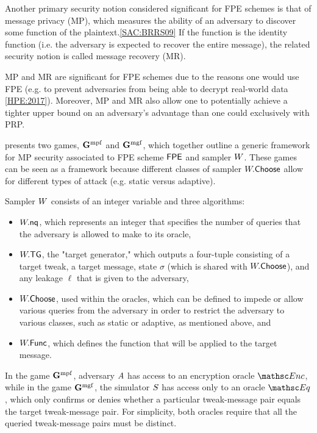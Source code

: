 
Another primary security notion considered significant for FPE schemes is that of message privacy (MP), which measures the ability of an adversary to discover some function of the plaintext.\ref{SAC:BRRS09} If the function is the identity function (i.e. the adversary is expected to recover the entire message), the related security notion is called message recovery (MR).

MP and MR are significant for FPE schemes due to the reasons one would use FPE (e.g. to prevent adversaries from being able to decrypt real-world data \ref{HPE:2017}). Moreover, MP and MR also allow one to potentially achieve a tighter upper bound on an adversary's advantage than one could exclusively with PRP.\

 presents two games, $\mathbf{G}^{\rm mpf}_{}$ and $\mathbf{G}^{\rm mgf}_{}$, which together outline a generic framework for MP security associated to FPE scheme $\mathsf{FPE}$ and sampler $W$. These games can be seen as a framework because different classes of sampler $W.\mathsf{Choose}$ allow for different types of attack (e.g. static versus adaptive).

Sampler $W$ consists of an integer variable and three algorithms:

\begin{itemize}
	\item $W.\mathsf{nq}$, which represents an integer that specifies the number of queries that the adversary is allowed to make to its oracle,
	\item $W.\mathsf{TG}$, the "target generator," which outputs a four-tuple consisting of a target tweak, a target message, state $\sigma$ (which is shared with $W.\mathsf{Choose}$), and any leakage $\ell$ that is given to the adversary, 
	\item $W.\mathsf{Choose}$, used within the oracles, which can be defined to impede or allow various queries from the adversary in order to restrict the adversary to various classes, such as static or adaptive, as mentioned above, and 
	\item $W.\mathsf{Func}$, which defines the function that will be applied to the target message.
\end{itemize}

In the game $\mathbf{G}^{\rm mpf}_{}$, adversary $A$ has access to an encryption oracle $\EncO$, while in the game $\mathbf{G}^{\rm mgf}_{}$, the simulator $S$ has access only to an oracle $\EqO$, which only confirms or denies whether a particular tweak-message pair equals the target tweak-message pair. For simplicity, both oracles require that all the queried tweak-message pairs must be distinct.\
 
